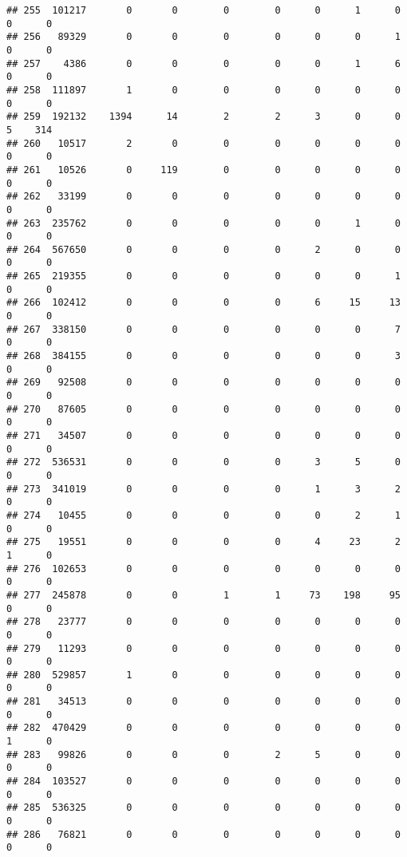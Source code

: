 \documentclass[
]{article}
\begin{document}
\begin{verbatim}
## 255  101217       0       0        0        0      0      1      0     0      0
## 256   89329       0       0        0        0      0      0      1     0      0
## 257    4386       0       0        0        0      0      1      6     0      0
## 258  111897       1       0        0        0      0      0      0     0      0
## 259  192132    1394      14        2        2      3      0      0     5    314
## 260   10517       2       0        0        0      0      0      0     0      0
## 261   10526       0     119        0        0      0      0      0     0      0
## 262   33199       0       0        0        0      0      0      0     0      0
## 263  235762       0       0        0        0      0      1      0     0      0
## 264  567650       0       0        0        0      2      0      0     0      0
## 265  219355       0       0        0        0      0      0      1     0      0
## 266  102412       0       0        0        0      6     15     13     0      0
## 267  338150       0       0        0        0      0      0      7     0      0
## 268  384155       0       0        0        0      0      0      3     0      0
## 269   92508       0       0        0        0      0      0      0     0      0
## 270   87605       0       0        0        0      0      0      0     0      0
## 271   34507       0       0        0        0      0      0      0     0      0
## 272  536531       0       0        0        0      3      5      0     0      0
## 273  341019       0       0        0        0      1      3      2     0      0
## 274   10455       0       0        0        0      0      2      1     0      0
## 275   19551       0       0        0        0      4     23      2     1      0
## 276  102653       0       0        0        0      0      0      0     0      0
## 277  245878       0       0        1        1     73    198     95     0      0
## 278   23777       0       0        0        0      0      0      0     0      0
## 279   11293       0       0        0        0      0      0      0     0      0
## 280  529857       1       0        0        0      0      0      0     0      0
## 281   34513       0       0        0        0      0      0      0     0      0
## 282  470429       0       0        0        0      0      0      0     1      0
## 283   99826       0       0        0        2      5      0      0     0      0
## 284  103527       0       0        0        0      0      0      0     0      0
## 285  536325       0       0        0        0      0      0      0     0      0
## 286   76821       0       0        0        0      0      0      0     0      0

\end{verbatim}
\end{document}
